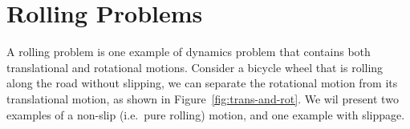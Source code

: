 \section{Rolling Problems}

A rolling problem is one example of dynamics problem that contains both
translational and rotational motions. Consider a bicycle wheel that is rolling
along the road without slipping, we can separate the rotational motion from
its translational motion, as shown in Figure~\ref{fig:trans-and-rot}.
We wil present two examples of a non-slip (i.e.\ pure rolling) motion, and one
example with slippage.

